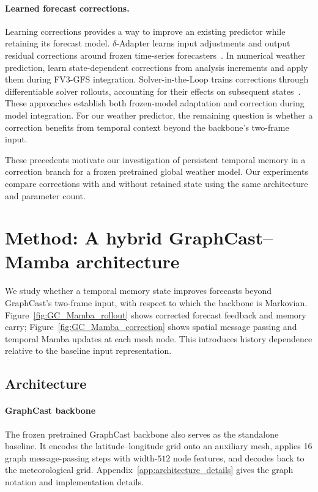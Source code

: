 \documentclass{article}
\begin{document}
\paragraph{Learned forecast corrections.}
Learning corrections provides a way to improve an existing predictor while retaining its forecast model. $\delta$-Adapter learns input adjustments and output residual corrections around frozen time-series forecasters~\citep{liang2026forecast}. In numerical weather prediction, \citet{chen2022correcting} learn state-dependent corrections from analysis increments and apply them during FV3-GFS integration. Solver-in-the-Loop trains corrections through differentiable solver rollouts, accounting for their effects on subsequent states~\citep{um2020solver}. These approaches establish both frozen-model adaptation and correction during model integration. For our weather predictor, the remaining question is whether a correction benefits from temporal context beyond the backbone's two-frame input.

These precedents motivate our investigation of persistent temporal memory in a correction branch for a frozen pretrained global weather model. Our experiments compare corrections with and without retained state using the same architecture and parameter count.
\par
\endgroup


\section{Method: A hybrid GraphCast--Mamba architecture}


We study whether a temporal memory state improves forecasts beyond GraphCast's two-frame input, with respect to which the backbone is Markovian. Figure~\ref{fig:GC_Mamba_rollout} shows corrected forecast feedback and memory carry; Figure~\ref{fig:GC_Mamba_correction} shows spatial message passing and temporal Mamba updates at each mesh node. This introduces history dependence relative to the baseline input representation.

\subsection{{Architecture}}

\paragraph{{GraphCast backbone}}
The frozen pretrained GraphCast backbone also serves as the standalone baseline. It encodes the latitude--longitude grid onto an auxiliary mesh, applies 16 graph message-passing steps with width-$512$ node features, and decodes back to the meteorological grid. Appendix~\ref{app:architecture_details} gives the graph notation and implementation details.
\end{document}
